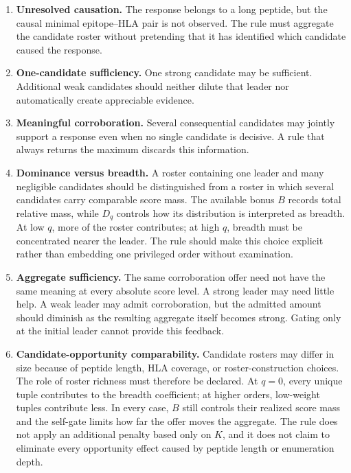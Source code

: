 \documentclass[11pt]{article}
\begin{document}
\begin{enumerate}[label=\textbf{P\arabic*.},leftmargin=*]
  \item \textbf{Unresolved causation.}
  The response belongs to a long peptide, but the causal minimal
  epitope--HLA pair is not observed. The rule must aggregate the candidate
  roster without pretending that it has identified which candidate caused the
  response.

  \item \textbf{One-candidate sufficiency.}
  One strong candidate may be sufficient. Additional weak candidates should
  neither dilute that leader nor automatically create appreciable evidence.

  \item \textbf{Meaningful corroboration.}
  Several consequential candidates may jointly support a response even when
  no single candidate is decisive. A rule that always returns the maximum
  discards this information.

  \item \textbf{Dominance versus breadth.}
  A roster containing one leader and many negligible candidates should be
  distinguished from a roster in which several candidates carry comparable
  score mass. The available bonus $B$ records total relative mass, while $D_q$
  controls how its distribution is interpreted as breadth. At low $q$, more
  of the roster contributes; at high $q$, breadth must be concentrated nearer
  the leader. The rule should make this choice explicit rather than embedding
  one privileged order without examination.

  \item \textbf{Aggregate sufficiency.}
  The same corroboration offer need not have the same meaning at every
  absolute score level. A strong leader may need little help. A weak leader
  may admit corroboration, but the admitted amount should diminish as the
  resulting aggregate itself becomes strong. Gating only at the initial
  leader cannot provide this feedback.

  \item \textbf{Candidate-opportunity comparability.}
  Candidate rosters may differ in size because of peptide length, HLA coverage,
  or roster-construction choices. The role of roster richness must therefore
  be declared. At $q=0$, every unique tuple contributes to the breadth
  coefficient; at higher orders, low-weight tuples contribute less. In every
  case, $B$ still controls their realized score mass and the self-gate limits
  how far the offer moves the aggregate. The rule does not apply an additional
  penalty based only on $K$, and it does not claim to eliminate every
  opportunity effect caused by peptide length or enumeration depth.


\end{enumerate}
\end{document}
